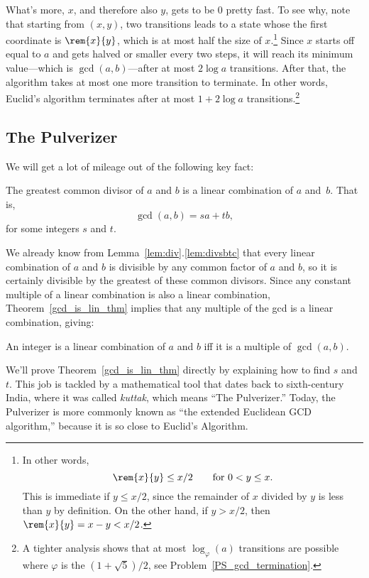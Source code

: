 What's more, $x$, and therefore also $y$, gets to be 0 pretty fast.
To see why, note that starting from $(x,y)$, two transitions leads to
a state whose the first coordinate is $\rem{x}{y}$, which is at most
half the size of $x$.\footnote{In other words,
\begin{equation}\label{rxylx2}
\rem{x}{y} \le x/2 \qquad \text{for $0 < y \le x$}.
\end{equation}
This is immediate if $y \le x/2$, since the remainder of $x$ divided
by $y$ is less than $y$ by definition.  On the other hand, if $y >
x/2$, then $\rem{x}{y} = x - y < x/2$.}  Since $x$ starts off equal to
$a$ and gets halved or smaller every two steps, it will reach its
minimum value---which is $\gcd(a,b)$---after at most $2 \log a$
transitions.  After that, the algorithm takes at most one more
transition to terminate.  In other words, Euclid's algorithm
terminates after at most $1+2 \log a$ transitions.\footnote{A tighter
  analysis shows that at most $\log_\varphi(a)$ transitions are
  possible where $\varphi$ is the  $(1 +
  \sqrt{5})/2$, see Problem~\ref{PS_gcd_termination}.}

\subsection{The Pulverizer}\label{sec:pulverizer}
We will get a lot of mileage out of the following key fact:
\begin{theorem}\label{gcd_is_lin_thm}
The greatest common divisor of $a$ and $b$ is a linear combination of
$a$ and~$b$.  That is,
\[
\gcd(a, b) = s a + t b,
\]
for some integers $s$ and $t$.
\end{theorem}

We already know from Lemma~\ref{lem:div}.\ref{lem:divsbtc} that every
linear combination of $a$ and $b$ is divisible by any common factor of
$a$ and $b$, so it is certainly divisible by the greatest of these
common divisors.  Since any constant multiple of a linear combination
is also a linear combination, Theorem~\ref{gcd_is_lin_thm} implies
that any multiple of the gcd is a linear combination, giving:
\begin{corollary}\label{cor:lin-comb}
An integer is a linear combination of $a$ and $b$ iff it is a multiple
of $\gcd(a, b)$.
\end{corollary}

We'll prove Theorem~\ref{gcd_is_lin_thm} directly by explaining how to
find $s$ and $t$.  This job is tackled by a mathematical tool that
dates back to sixth-century India, where it was called \emph{kuttak},
which means ``The Pulverizer.''  Today, the Pulverizer is more
commonly known as ``the extended Euclidean GCD algorithm,'' because it
is so close to Euclid's Algorithm.

